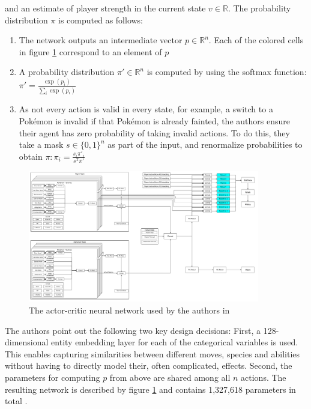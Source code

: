 and an estimate of player strength in the current state $v \in \mathbb{R}$. The probability distribution
$\pi$ is computed as follows:
\begin{enumerate}
    \item The network outputs an intermediate vector $p \in \mathbb{R}^n$. Each of the colored cells in
    figure \ref{fig:lee-network} correspond to an element of $p$
    \item A probability distribution $\pi' \in \mathbb{R}^n$ is computed by using the
    softmax function: $\pi' = \frac{\exp(p_i)}{\sum_i \exp(p_i)}$
    \item As not every action is valid in every state, for example, a switch to a Pokémon is invalid
    if that Pokémon is already fainted, the authors ensure their agent has zero probability of taking
    invalid actions. To do this, they take a mask $s \in \{0, 1\}^n$ as part of the input, and 
    renormalize probabilities to obtain $\pi: \pi_i = \frac{s_i \pi'_i}{s^T \pi'}$
\end{enumerate}
\begin{figure}
	\centering
	\includegraphics[width=0.9\textwidth]{images/RL-Network-Structure.png}
	\caption{The actor-critic neural network used by the authors in \cite{Huang_Lee_2019}}
	\label{fig:lee-network}
\end{figure}
The authors point out the following two key design decisions: First, a 128-dimensional entity embedding layer
for each of the categorical variables is used. This enables capturing similarities between different moves,
species and abilities without having to directly model their, often complicated, effects. Second, the
parameters for computing $p$ from above are shared among all $n$ actions. The resulting network is described
by figure \ref{fig:lee-network} and contains 1,327,618 parameters in total \cite{Huang_Lee_2019}.

